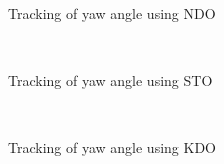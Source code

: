 \documentclass[letterpaper%
, twoside%
, 12pt%
,memoire%
, english%
,creativecommons,hyperref%
]{thETS}
\begin{document}
\begin{figure}[H]
\centering
{}
\\ \parbox{0.75\textwidth}{\caption{Tracking of yaw angle using NDO}
\label{yaw_trac_dis_m1_ndo}}
\end{figure}

\begin{figure}[H]
\centering
{}
\\ \parbox{0.75\textwidth}{\caption{Tracking of yaw angle using STO}
\label{yaw_trac_dis_m1_sto}}
\end{figure}

\begin{figure}[H]
\centering
{}
\\ \parbox{0.75\textwidth}{\caption{Tracking of yaw angle using KDO}
\label{yaw_trac_dis_m1_kdo}}
\end{figure}
\end{document}
